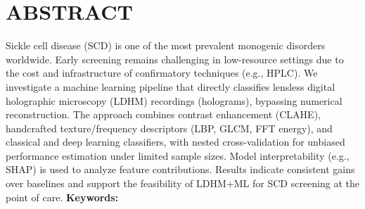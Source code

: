 \chapter{ABSTRACT}
Sickle cell disease (SCD) is one of the most prevalent monogenic disorders worldwide. Early screening remains challenging in low-resource settings due to the cost and infrastructure of confirmatory techniques (e.g., HPLC). We investigate a machine learning pipeline that directly classifies lensless digital holographic microscopy (LDHM) recordings (holograms), bypassing numerical reconstruction. The approach combines contrast enhancement (CLAHE), handcrafted texture/frequency descriptors (LBP, GLCM, FFT energy), and classical and deep learning classifiers, with nested cross-validation for unbiased performance estimation under limited sample sizes. Model interpretability (e.g., SHAP) is used to analyze feature contributions. Results indicate consistent gains over baselines and support the feasibility of LDHM+ML for SCD screening at the point of care.
\textbf{Keywords:} 